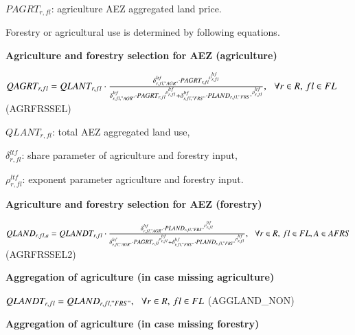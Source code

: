 \documentclass[10pt,a4paper,titlepage,dvipdfmx]{book}
\begin{document}
\begin{flushleft} $PAGRT_{r,fl}$: agriculture AEZ aggregated land price. \end{flushleft}

Forestry or agricultural use is determined by following equations.

\begin{flushleft}\textbf{Agriculture and forestry selection for AEZ (agriculture)}\end{flushleft}


\begin{center}$QAGRT_{r,fl}=QLANT_{r,fl}\cdot \frac{\delta _{r,fl,"AGR"}^{ltf}\cdot PAGR{T_{r,fl}}^{\rho _{r,fl}^{ltf}}}{\delta _{r,fl,"AGR"}^{ltf}\cdot PAGR{T_{r,fl}}^{\rho _{r,fl}^{ltf}}+\delta _{r,fl,"FRS"}^{ltf}\cdot PLAN{D_{r,fl,"FRS"}}^{\rho _{r,fl}^{ltf}}},\,\,\,\,\forall r\in R,\,fl\in FL$ (AGRFRSSEL)
\end{center}

\begin{flushleft}
$QLANT_{r,fl}$: total AEZ aggregated land use,

$\delta _{r,fl}^{ltf}$: share parameter of agriculture and forestry input,

$\rho _{r,fl}^{ltf}$: exponent parameter agriculture and forestry input.
\end{flushleft}

\begin{flushleft}\textbf{Agriculture and forestry selection for AEZ (forestry)}\end{flushleft}


\begin{center}$QLAND_{r,fl,a}=QLANDT_{r,fl}\cdot \frac{\delta _{r,fl,"AGR"}^{ltf}\cdot PLAN{D_{r,fl,"FRS"}}^{\rho _{r,fl}^{ltf}}}{\delta _{r,fl,"AGR"}^{ltf}\cdot PAGR{T_{r,fl}}^{\rho _{r,fl}^{ltf}}+\delta _{r,fl,"FRS"}^{ltf}\cdot PLAN{D_{r,fl,"FRS"}}^{\rho _{r,fl}^{ltf}}},\,\,\,\,\forall r\in R,\,fl\in FL,A\in AFRS$ (AGRFRSSEL2)
\end{center}

\begin{flushleft}\textbf{Aggregation of agriculture (in case missing agriculture)}\end{flushleft}


\begin{center}$QLANDT_{r,fl}=QLAND_{r,fl,"FRS"},\,\,\,\,\forall r\in R,\,fl\in FL$ (AGGLAND\_NON)
\end{center}

\begin{flushleft}\textbf{Aggregation of agriculture (in case missing forestry)}\end{flushleft}
\end{document}
